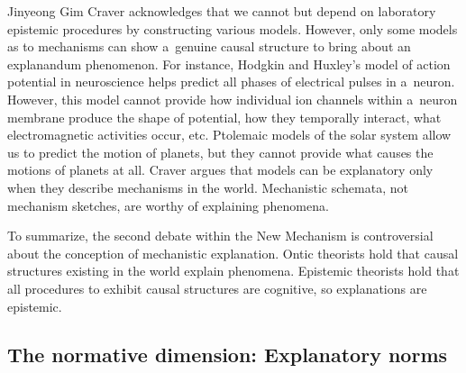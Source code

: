 \begin{artengenv}{Jinyeong Gim}
Craver acknowledges that we cannot but depend on laboratory epistemic procedures by constructing various models. However, only some models as to mechanisms can show a~genuine causal structure to bring about an explanandum phenomenon. For instance, Hodgkin and Huxley's model of action potential in neuroscience helps predict all phases of electrical pulses in a~neuron. However, this model cannot provide how individual ion channels within a~neuron membrane produce the shape of potential, how they temporally interact, what electromagnetic activities occur, etc. Ptolemaic models of the solar system allow us to predict the motion of planets, but they cannot provide what causes the motions of planets at all. Craver
\parencite*[][p.367]{craver_when_2006} %
 argues that models can be explanatory only when they describe mechanisms in the world. Mechanistic schemata, not mechanism sketches, are worthy of explaining phenomena.

To summarize, the second debate within the New Mechanism is controversial about the conception of mechanistic explanation. Ontic theorists hold that causal structures existing in the world explain phenomena. Epistemic theorists hold that all procedures to exhibit causal structures are cognitive, so explanations are epistemic.

\subsection{The normative dimension: Explanatory norms}


\end{artengenv}
